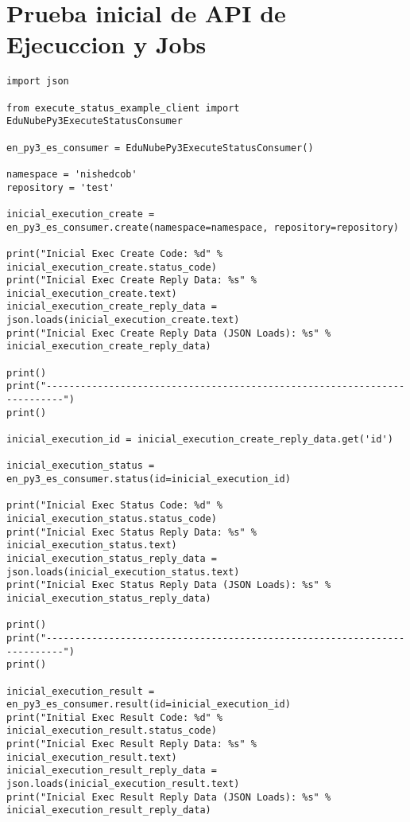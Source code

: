 \section{Prueba inicial de API de Ejecuccion y Jobs}
\lstset{language=Python}
\begin{lstlisting}[breaklines]
import json

from execute_status_example_client import EduNubePy3ExecuteStatusConsumer

en_py3_es_consumer = EduNubePy3ExecuteStatusConsumer()

namespace = 'nishedcob'
repository = 'test'

inicial_execution_create = en_py3_es_consumer.create(namespace=namespace, repository=repository)

print("Inicial Exec Create Code: %d" % inicial_execution_create.status_code)
print("Inicial Exec Create Reply Data: %s" % inicial_execution_create.text)
inicial_execution_create_reply_data = json.loads(inicial_execution_create.text)
print("Inicial Exec Create Reply Data (JSON Loads): %s" % inicial_execution_create_reply_data)

print()
print("-------------------------------------------------------------------------")
print()

inicial_execution_id = inicial_execution_create_reply_data.get('id')

inicial_execution_status = en_py3_es_consumer.status(id=inicial_execution_id)

print("Inicial Exec Status Code: %d" % inicial_execution_status.status_code)
print("Inicial Exec Status Reply Data: %s" % inicial_execution_status.text)
inicial_execution_status_reply_data = json.loads(inicial_execution_status.text)
print("Inicial Exec Status Reply Data (JSON Loads): %s" % inicial_execution_status_reply_data)

print()
print("-------------------------------------------------------------------------")
print()

inicial_execution_result = en_py3_es_consumer.result(id=inicial_execution_id)
print("Initial Exec Result Code: %d" % inicial_execution_result.status_code)
print("Inicial Exec Result Reply Data: %s" % inicial_execution_result.text)
inicial_execution_result_reply_data = json.loads(inicial_execution_result.text)
print("Inicial Exec Result Reply Data (JSON Loads): %s" % inicial_execution_result_reply_data)
\end{lstlisting}
\lstset{language=Bash}

